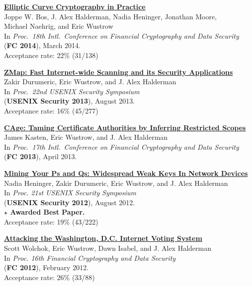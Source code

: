 \documentclass[margin,11pt]{res} %
\begin{document}
    \textbf{\href{http://eprint.iacr.org/2013/734}{Elliptic Curve Cryptography in Practice}} \\
    Joppe W. Bos, J. Alex Halderman, Nadia Heninger, Jonathan Moore,\\ Michael Naehrig, and Eric Wustrow \\
    In \emph{Proc.\ 18th Intl.\ Conference on Financial Cryptography and Data Security} \\
    (\textbf{FC 2014}), March 2014. \\
    Acceptance rate: 22\% (31/138)

    \textbf{\href{https://zmap.io/paper.html}{ZMap: Fast Internet-wide Scanning and its Security Applications}} \\
    Zakir Durumeric, Eric Wustrow, and J. Alex Halderman \\
    In \emph{Proc.\ 22nd USENIX Security Symposium} \\
    (\textbf{USENIX Security 2013}), August 2013. \\
    Acceptance rate: 16\% (45/277)


    \textbf{\href{https://jhalderm.com/pub/papers/cage-fc13.pdf}{CAge: Taming Certificate Authorities by Inferring Restricted Scopes}} \\
    James Kasten, Eric Wustrow, and J. Alex Halderman \\
    In \emph{Proc.\ 17th Intl.\ Conference on Financial Cryptography and Data Security} \\
    (\textbf{FC 2013}), April 2013.

    \textbf{\href{https://factorable.net/weakkeys12.conference.pdf}{Mining Your Ps and Qs: Widespread Weak Keys In Network Devices}} \\
    Nadia Heninger, Zakir Durumeric, Eric Wustrow, and J. Alex Halderman \\
    In \emph{Proc. 21st USENIX Security Symposium} \\
    (\textbf{USENIX Security 2012}), August 2012. \\
    \textbf{$\star$ Awarded Best Paper.} \\
    Acceptance rate: 19\% (43/222)

    \textbf{\href{https://ericw.us/trow/dc-internet-voting-fc.pdf}{Attacking the Washington, D.C. Internet Voting System}} \\
    Scott Wolchok, Eric Wustrow, Dawn Isabel, and J. Alex Halderman \\
    In \emph{Proc. 16th Financial Cryptography and Data Security} \\
    (\textbf{FC 2012}), February 2012. \\
    Acceptance rate: 26\% (33/88)
\end{document}
